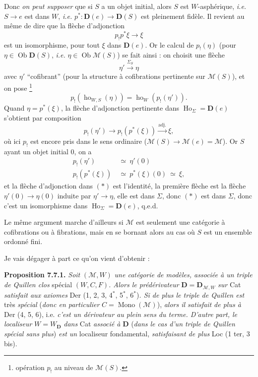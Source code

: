 \documentclass[11pt]{article}
\newcommand{\printedpage}[1]{\marginpar{\footnotesize p.~#1}}
\newcommand{\msp}[1]{\marginpar{\footnotesize [#1]}}
\begin{document}
Donc \textit{on peut supposer} que si $S$ a un objet initial, alors $S$ est $W$-asphérique, \textit{i.e.} $S\longrightarrow e$ est dans $W$, \textit{i.e.} $p^*:\mathbf{D}(e)\longrightarrow\mathbf{D}(S)$ est pleinement fidèle. Il revient au même de dire que la flèche d'adjonction
\[ p_!p^*\xi\longrightarrow\xi \]
est un isomorphisme, pour tout $\xi$ dans $\mathbf{D}(e)$. Or le calcul de $p_!(\eta)$ (pour $\eta\in\operatorname{Ob}\mathbf{D}(S)$, \textit{i.e.} $\eta\in\operatorname{Ob}\mathcal{M}(S)$) se fait ainsi : on choisit une flèche
\[ \eta'\xrightarrow{\Sigma_S}\eta \]
avec $\eta'$ ``cofibrant'' (pour la structure à cofibrations pertinente sur $\mathcal{M}(S)$), et on
\msp{page 116}
pose \footnote[54]{opération $p_!$ au niveau de $\mathcal{M}(S)$.}
\[ p_!(\operatorname{ho}_{W,S}(\eta))=\operatorname{ho}_W(p_!(\eta')). \]
Quand $\eta=p^*(\xi)$, la flèche d'adjonction pertinente dans $\operatorname{Ho}_\Sigma=\mathbf{D}(e)$ s'obtient par composition
\[ p_!(\eta')\longrightarrow p_!(p^*(\xi))\xrightarrow{\text{adj.}}\xi, \tag*{$(*)$} \]
où ici $p_!$ est encore pris dans le sens ordinaire ($\mathcal{M}(S)\longrightarrow\mathcal{M}(e)=\mathcal{M}$). Or $S$ ayant un objet initial 0, on a
\[ \begin{aligned}
p_!(\eta') &\ \simeq\ \eta'(0)\\
p_!(p^*(\xi)) &\ \simeq\ p^*(\xi)(0)\ \simeq\ \xi,
\end{aligned} \]
et la flèche d'adjonction dans $(*)$ est l'identité, la première flèche est la flèche $\eta'(0)\longrightarrow\eta(0)$ induite par $\eta'\longrightarrow\eta$, elle est dans $\Sigma$, donc $(*)$ est dans $\Sigma$, donc c'est un isomorphisme dans $\operatorname{Ho}_\Sigma=\mathbf{D}(e)$, q.e.d.

Le même argument marche d'ailleurs si $\mathcal{M}$ est seulement une catégorie à cofibrations ou à fibrations, mais en se bornant alors au cas où $S$ est un ensemble ordonné fini.

\newpage
\printedpage{55}
\msp{page 117}
Je vais dégager à part ce qu'on vient d'obtenir :

\textbf{Proposition 7.7.1.} \textit{Soit} $(\mathcal{M},W)$ \textit{une catégorie de modèles, associée à un triple de Quillen clos} spécial $(W,C,F)$\textit{. Alors le prédérivateur} $\mathbf{D}=\mathbf{D}_{\mathcal{M},W}$ \textit{sur} Cat \textit{satisfait aux axiomes} Der (1, 2, 3, 4$^*$, 5$^*$, 6$^*$)\textit{. Si de plus le triple de Quillen est} très \textit{spécial} (\textit{donc en particulier} $C=\operatorname{Mono}(\mathcal{M})$), \textit{alors il satisfait de plus à} Der (4, 5, 6), i.e. \textit{c'est un dérivateur au plein sens du terme. D'autre part, le localiseur} $W=W_{\mathbf{D}}$ \textit{dans} Cat \textit{associé à} $\mathbf{D}$ (\textit{dans le cas d'un triple de Quillen spécial sans plus}) \textit{est un} localiseur fondamental, \textit{satisfaisant de plus} Loc (1 ter, 3 bis).
\end{document}
